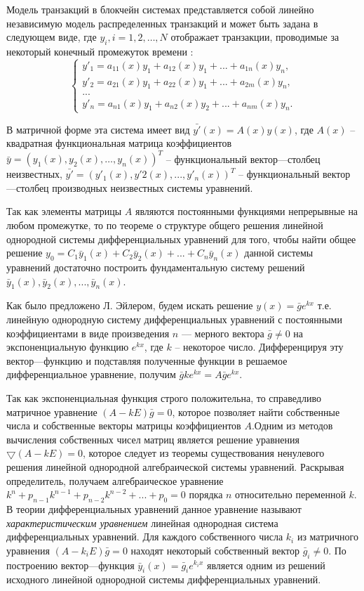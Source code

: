Модель транзакций в блокчейн системах представляется собой линейно независимую модель распределенных транзакций и может быть задана в следующем виде, где $y_i, i=1,2, …, N$ отображает транзакции, проводимые за некоторый конечный промежуток времени :
\begin{equation}
	\begin{cases}
		y'_{1}= a_{11}(x)y_{1}+a_{12}(x)y_{1}+ ... + a_{1n}(x)y_{n}, \\
		y'_{2}= a_{21}(x)y_{1}+a_{22}(x)y_{1}+ ... + a_{2m}(x)y_{n} , \\
		... \\
		y'_{n}= a_{n1}(x)y_{1}+a_{n2}(x)y_{2}+ ... + a_{nm}(x)y_{n}. 
	\end{cases}
\end{equation}



В матричной форме эта система имеет вид $\bar{y'}(x)=A(x)y(x)$, где $A(x)$ – квадратная функциональная матрица коэффициентов 
$\bar{y}=(y_1(x),  y_2(x), …,y_n(x))^T$ – функциональный вектор—столбец неизвестных, $\bar{y'}=(y'_1(x),  y'2(x), ... ,y'_n(x))^T$ – функциональный вектор—столбец производных неизвестных системы уравнений.

Так как элементы матрицы $A$ являются постоянными функциями непрерывные на любом промежутке, то по теореме о структуре общего решения линейной однородной системы дифференциальных уравнений для того, чтобы найти общее решение $y_0= C_1\bar{y}_1(x)+C_{2}\bar{y}_{2}(x)+ ... + C_{n}\bar{y}_{n}(x)$ данной системы уравнений достаточно построить фундаментальную систему решений $\bar{y}_{1}(x), \bar{y}_2(x), ... , \bar{y}_n(x)$.

Как было предложено Л. Эйлером, будем искать решение $y(x)= \bar{g}e^{kx}$ т.е. линейную однородную систему дифференциальных уравнений с постоянными коэффициентами в виде произведения $n$ — мерного вектора $\bar{g} \neq 0$  на экспоненциальную функцию $e^{kx}$, где $k$  – некоторое число. Дифференцируя эту вектор—функцию и подставляя полученные функции в решаемое дифференциальное уравнение, получим $\bar{g}ke^{kx}=A\bar{g}e^{kx}$. 

Так как экспоненциальная функция строго положительна, то справедливо матричное уравнение $(A-kE)\bar{g}= 0$, которое позволяет найти собственные числа и собственные векторы матрицы коэффициентов $A$.Одним из методов вычисления собственных чисел матриц является решение уравнения $\bigtriangledown(A-kE) = 0$, которое следует из теоремы существования ненулевого решения линейной однородной алгебраической системы уравнений. Раскрывая определитель, получаем алгебраическое уравнение $k^n+ p_{n-1}k^{n-1}+p_{n-2}k^{n-2}+ ...+ p_0=0$   порядка $n$  относительно переменной $k$. В теории дифференциальных уравнений данное уравнение называют \textit{характеристическим уравнением} линейная однородная система дифференциальных уравнений. Для каждого собственного числа $k_i$  из матричного уравнения $(A-k_{i}E)\bar{g}=0$  находят некоторый собственный вектор $\bar{g}_i\neq0$. По построению вектор—функция $\bar{y}_i(x)= \bar{g}_{i}e^{k_{i}x}$  является одним из решений исходного линейной однородной системы дифференциальных уравнений.

